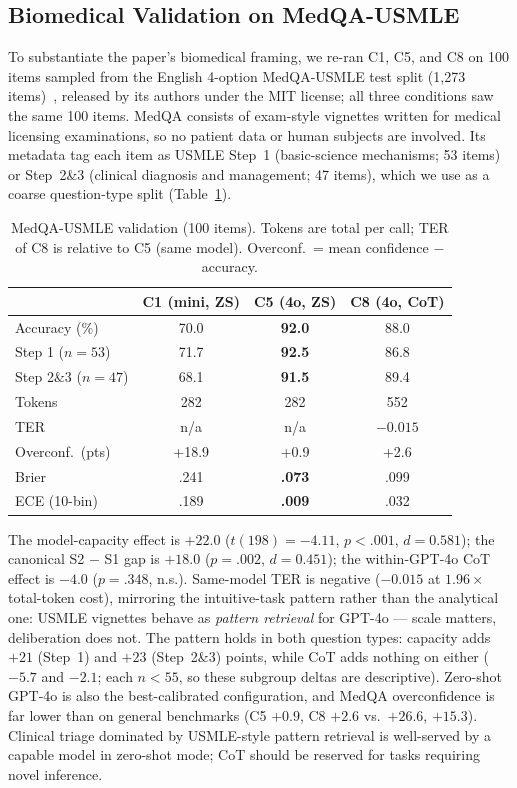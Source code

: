 \documentclass[conference]{IEEEtran}
\begin{document}
\subsection{Biomedical Validation on MedQA-USMLE}
\label{sec:medqa}

To substantiate the paper's biomedical framing, we re-ran C1, C5, and C8 on 100 items sampled from the English 4-option MedQA-USMLE test split (1{,}273 items)~\cite{Jin2021}, released by its authors under the MIT license; all three conditions saw the same 100 items. MedQA consists of exam-style vignettes written for medical licensing examinations, so no patient data or human subjects are involved. Its metadata tag each item as USMLE Step~1 (basic-science mechanisms; 53 items) or Step~2\&3 (clinical diagnosis and management; 47 items), which we use as a coarse question-type split (Table~\ref{tab:medqa}).

\begin{table}[t]
\caption{MedQA-USMLE validation (100 items). Tokens are total per call; TER of C8 is relative to C5 (same model). Overconf.\ = mean confidence $-$ accuracy.}
\label{tab:medqa}
\centering
\setlength{\tabcolsep}{5pt}
\begin{tabular}{lccc}
\toprule
 & C1 (mini, ZS) & C5 (4o, ZS) & C8 (4o, CoT) \\
\midrule
Accuracy (\%) & 70.0 & \textbf{92.0} & 88.0 \\
\quad Step 1 ($n=53$) & 71.7 & \textbf{92.5} & 86.8 \\
\quad Step 2\&3 ($n=47$) & 68.1 & \textbf{91.5} & 89.4 \\
Tokens & 282 & 282 & 552 \\
TER & n/a & n/a & $-0.015$ \\
Overconf.\ (pts) & +18.9 & +0.9 & +2.6 \\
Brier & .241 & \textbf{.073} & .099 \\
ECE (10-bin) & .189 & \textbf{.009} & .032 \\
\bottomrule
\end{tabular}
\end{table}

The model-capacity effect is $+22.0$ ($t(198) = -4.11$, $p < .001$, $d = 0.581$); the canonical S2 $-$ S1 gap is $+18.0$ ($p = .002$, $d = 0.451$); the within-GPT-4o CoT effect is $-4.0$ ($p = .348$, n.s.). Same-model TER is negative ($-0.015$ at $1.96\times$ total-token cost), mirroring the intuitive-task pattern rather than the analytical one: USMLE vignettes behave as \textit{pattern retrieval} for GPT-4o --- scale matters, deliberation does not. The pattern holds in both question types: capacity adds $+21$ (Step~1) and $+23$ (Step~2\&3) points, while CoT adds nothing on either ($-5.7$ and $-2.1$; each $n < 55$, so these subgroup deltas are descriptive). Zero-shot GPT-4o is also the best-calibrated configuration, and MedQA overconfidence is far lower than on general benchmarks (C5 $+0.9$, C8 $+2.6$ vs.\ $+26.6$, $+15.3$). Clinical triage dominated by USMLE-style pattern retrieval is well-served by a capable model in zero-shot mode; CoT should be reserved for tasks requiring novel inference.
\end{document}
